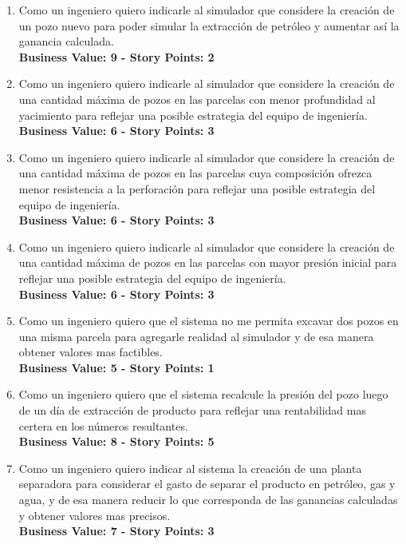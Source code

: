\begin{enumerate}
  
  \item Como un ingeniero quiero indicarle al simulador que considere la creación de un pozo nuevo para poder simular la extracción de petróleo y aumentar así la ganancia calculada.\\
  \textbf{Business Value: 9 - Story Points: 2}
  
  \item Como un ingeniero quiero indicarle al simulador que considere la creación de una cantidad máxima de pozos en las parcelas con menor profundidad al yacimiento para reflejar una posible estrategia del equipo de ingeniería.\\
  \textbf{Business Value: 6 - Story Points: 3}
  
  \item Como un ingeniero quiero indicarle al simulador que considere la creación de una cantidad máxima de pozos en las parcelas cuya composición ofrezca menor resistencia a la perforación para reflejar una posible estrategia del equipo de ingeniería.\\
  \textbf{Business Value: 6 - Story Points: 3}
  
  \item Como un ingeniero quiero indicarle al simulador que considere la creación de una cantidad máxima de pozos en las parcelas con mayor presión inicial para reflejar una posible estrategia del equipo de ingeniería.\\
  \textbf{Business Value: 6 - Story Points: 3}
  
  \item Como un ingeniero quiero que el sistema no me permita excavar dos pozos en una misma parcela para agregarle realidad al simulador y de esa manera obtener valores mas factibles.\\
  \textbf{Business Value: 5 - Story Points: 1}
  
  \item Como un ingeniero quiero que el sistema recalcule la presión del pozo luego de un día de extracción de producto para reflejar una rentabilidad mas certera en los números resultantes.\\
  \textbf{Business Value: 8 - Story Points: 5}
  
  \item Como un ingeniero quiero indicar al sistema la creación de una planta separadora para considerar el gasto de separar el producto en petróleo, gas y agua, y de esa manera reducir lo que corresponda de las ganancias calculadas y obtener valores mas precisos.\\
  \textbf{Business Value: 7 - Story Points: 3}
  

\end{enumerate}
